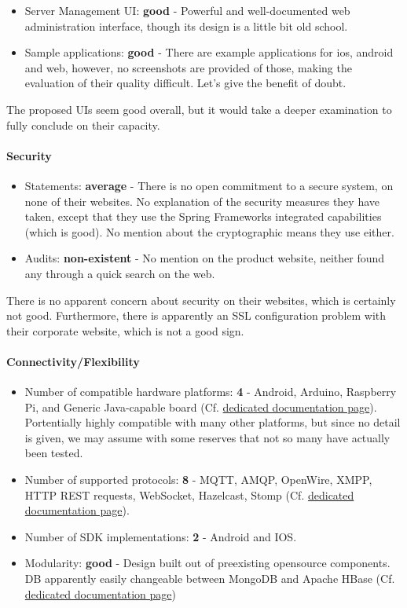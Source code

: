 \documentclass{article}
\begin{document}
\begin{itemize}
\item Server Management UI: \textbf{good} - Powerful and well-documented web administration interface, though its design is a little bit old school.
\item Sample applications: \textbf{good} - There are example applications for ios, android and web, however, no screenshots are provided of those, making the evaluation of their quality difficult. Let's give the benefit of doubt.
\end{itemize}

The proposed UIs seem good overall, but it would take a deeper examination to fully conclude on their capacity.

\paragraph{Security} 

\begin{itemize}
\item Statements: \textbf{average} - There is no open commitment to a secure system, on none of their websites. No explanation of the security measures they have taken, except that they use the Spring Frameworks integrated capabilities (which is good). No mention about the cryptographic means they use either.
\item Audits: \textbf{non-existent} - No mention on the product website, neither found any through a quick search on the web.
\end{itemize}

There is no apparent concern about security on their websites, which is certainly not good. Furthermore, there is apparently an SSL configuration problem with their corporate website, which is not a good sign.

\paragraph{Connectivity/Flexibility}

\begin{itemize}
\item Number of compatible hardware platforms: \textbf{4} - Android, Arduino, Raspberry Pi, and Generic Java-capable board (Cf. \href{http://documentation.sitewhere.io/integration.html}{dedicated documentation page}). Portentially highly compatible with many other platforms, but since no detail is given, we may assume with some reserves that not so many have actually been tested.
\item Number of supported protocols: \textbf{8} - MQTT, AMQP, OpenWire, XMPP, HTTP REST requests, WebSocket, Hazelcast, Stomp (Cf. \href{http://documentation.sitewhere.io/userguide/tenant/device-communication.html}{dedicated documentation page}).
\item Number of SDK implementations: \textbf{2} - Android and IOS.
\item Modularity: \textbf{good} - Design built out of preexisting opensource components. DB apparently easily changeable between MongoDB and Apache HBase (Cf. \href{http://documentation.sitewhere.io/architecture.html}{dedicated documentation page})
\end{itemize}
\end{document}
